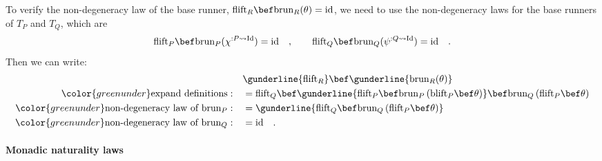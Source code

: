 To verify the non-degeneracy law of the base runner, $\text{flift}_{R}\bef\text{brun}_{R}(\theta)=\text{id}$,
we need to use the non-degeneracy laws for the base runners of $T_{P}$
and $T_{Q}$, which are 
\[
\text{flift}_{P}\bef\text{brun}_{P}(\chi^{:P\leadsto\text{Id}})=\text{id}\quad,\quad\quad\text{flift}_{Q}\bef\text{brun}_{Q}(\psi^{:Q\leadsto\text{Id}})=\text{id}\quad.
\]
Then we can write:
\begin{align*}
 & \gunderline{\text{flift}_{R}}\bef\gunderline{\text{brun}_{R}(\theta)}\\
{\color{greenunder}\text{expand definitions}:}\quad & =\text{flift}_{Q}\bef\gunderline{\text{flift}_{P}\bef\text{brun}_{P}\left(\text{blift}_{P}\bef\theta\right)}\bef\text{brun}_{Q}\left(\text{flift}_{P}\bef\theta\right)\\
{\color{greenunder}\text{non-degeneracy law of }\text{brun}_{P}:}\quad & =\gunderline{\text{flift}_{Q}\bef\text{brun}_{Q}\left(\text{flift}_{P}\bef\theta\right)}\\
{\color{greenunder}\text{non-degeneracy law of }\text{brun}_{Q}:}\quad & =\text{id}\quad.
\end{align*}


\paragraph{Monadic naturality laws}

